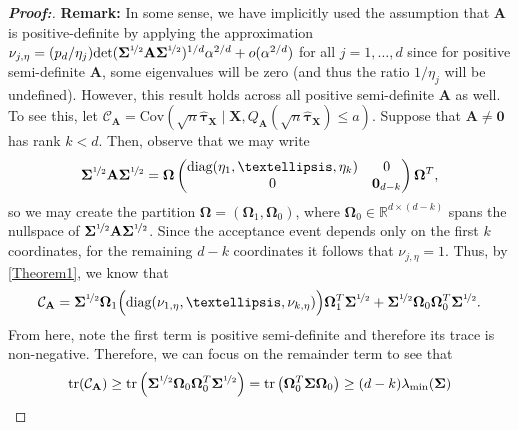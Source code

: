 \documentclass[11pt,twoside]{article}
\theoremstyle{definition}
\theoremstyle{remark}
\begin{document}
\begin{proof}[\textbf{Proof:}]
\noindent \textbf{Remark:} In some sense, we have implicitly used the assumption that $\mathbf{A}$ is positive-definite by applying the approximation $\nu_{j, \eta} = (p_d / \eta_j) \text{det}(\mathbf{\Sigma}^{\nicefrac{1}{2}}\mathbf{A}\mathbf{\Sigma}^{\nicefrac{1}{2}})^{1/d} \alpha^{2/d} + o(\alpha^{2/d})$ for all $j = 1, \ldots, d$ since for positive semi-definite $\mathbf{A}$, some eigenvalues will be zero (and thus the ratio $1 / \eta_j$ will be undefined). However, this result holds across all positive semi-definite $\mathbf{A}$ as well. To see this, let $\mathcal C_{\mathbf{A}} = \text{Cov}(\sqrt n\widehat{\bm{\tau}}_{\mathbf{X}} \mid \mathbf{X},
Q_{\mathbf{A}}(\sqrt{n} \widehat{\bm{\tau}}_{\mathbf{X}}) \leq a)$. Suppose that $\mathbf{A} \neq \mathbf{0}$ has rank $k < d$. Then, observe that we may write 
\begin{align*}
    \mathbf{\Sigma}^{\nicefrac{1}{2}} \mathbf{A} \mathbf{\Sigma}^{\nicefrac{1}{2}} = \mathbf{\Omega} \begin{pmatrix} \text{diag}(\eta_1,\ldots,\eta_k) & 0\\
    0 & \mathbf{0}_{d-k}
    \end{pmatrix}
\mathbf{\Omega}^T,
\end{align*}
so we may create the partition $\mathbf{\Omega}=(\mathbf{\Omega}_1,\mathbf{\Omega}_0)$, where $\mathbf{\Omega}_0\in\mathbb{R} ^{d\times(d-k)}$ spans the nullspace of $\mathbf{\Sigma}^{\nicefrac{1}{2}} \mathbf{A} \mathbf{\Sigma}^{\nicefrac{1}{2}}$. Since the acceptance event depends only on the first $k$ coordinates, for the remaining $d - k$ coordinates it follows that $\nu_{j,\eta}=1$. Thus, by \cref{Theorem1}, we know that
\begin{align*}
    \mathcal{C}_{\mathbf{A}} = \mathbf{\Sigma}^{\nicefrac{1}{2}}\mathbf{\Omega}_1 \Big( \text{diag}(\nu_{1,\eta},\ldots,\nu_{k,\eta}) \Big) \mathbf{\Omega}_1^T\mathbf{\Sigma}^{\nicefrac{1}{2}} + \mathbf{\Sigma}^{\nicefrac{1}{2}}\mathbf{\Omega}_0\mathbf{\Omega}_0^T \mathbf{\Sigma}^{\nicefrac{1}{2}}.
\end{align*}
From here, note the first term is positive semi-definite and therefore its trace is non-negative. Therefore, we can focus on the remainder term to see that
\begin{align*}
    \text{tr}(\mathcal C_{\mathbf{A}}) \geq \text{tr}\left( \mathbf{\Sigma}^{\nicefrac{1}{2}}\mathbf{\Omega}_0\mathbf{\Omega}_0^T \mathbf{\Sigma}^{\nicefrac{1}{2}} \right) = \text{tr}\left(\mathbf{\Omega}_0^T\mathbf{\Sigma}\mathbf{\Omega}_0\right) \geq (d-k)\lambda_{\min}(\mathbf{\Sigma})

\end{align*}
\end{proof}
\end{document}
